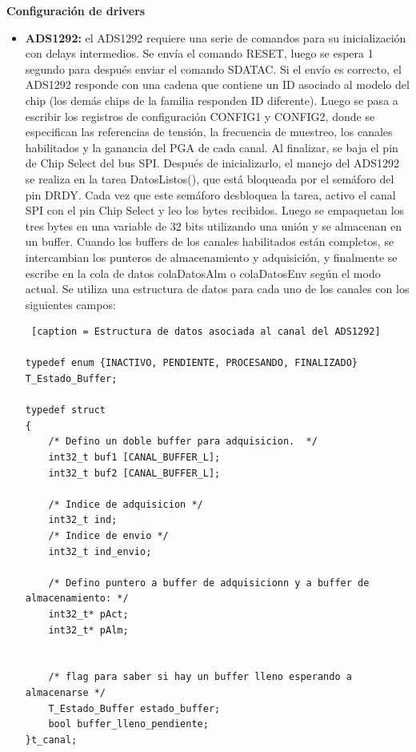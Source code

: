 \textbf{Configuración de drivers}

\begin{itemize}

 	\item \textbf{ADS1292:} el ADS1292 requiere una serie de comandos para su inicialización\cite{texas2012} con delays intermedios. Se envía el comando RESET, luego se espera 1 segundo para después enviar el comando SDATAC. Si el envío es correcto, el ADS1292 responde con una cadena que contiene un ID asociado al modelo del chip (los demás chips de la familia responden ID diferente). 
 	Luego se pasa a escribir los registros de configuración CONFIG1 y CONFIG2, donde se especifican las referencias de tensión, la frecuencia de muestreo, los canales habilitados y la ganancia del PGA de cada canal. Al finalizar, se baja el pin de Chip Select del bus SPI. 
 	Después de inicializarlo, el manejo del ADS1292 se realiza en la tarea DatosListos(), que está bloqueada por el semáforo del pin DRDY. Cada vez que este semáforo desbloquea la tarea, activo el canal SPI con el pin Chip Select y leo los bytes recibidos. Luego se empaquetan los tres bytes en una variable de 32 bits utilizando una unión y se almacenan en un buffer. Cuando los buffers de los canales habilitados están completos, se intercambian los punteros de almacenamiento y adquisición, y finalmente se escribe en la cola de datos colaDatosAlm o colaDatosEnv según el modo actual.
 	Se utiliza una estructura de datos para cada uno de los canales con los siguientes campos:
 	
\footnotesize 	
\begin{lstlisting} [caption = Estructura de datos asociada al canal del ADS1292]

typedef enum {INACTIVO, PENDIENTE, PROCESANDO, FINALIZADO} T_Estado_Buffer;

typedef struct
{
	/* Defino un doble buffer para adquisicion.  */
	int32_t buf1 [CANAL_BUFFER_L];
	int32_t buf2 [CANAL_BUFFER_L];

	/* Indice de adquisicion */
	int32_t ind;
	/* Indice de envio */
	int32_t ind_envio;

	/* Defino puntero a buffer de adquisicionn y a buffer de almacenamiento: */
	int32_t* pAct;
	int32_t* pAlm;


	/* flag para saber si hay un buffer lleno esperando a almacenarse */
	T_Estado_Buffer estado_buffer;
	bool buffer_lleno_pendiente;
}t_canal;


\end{lstlisting}	
\normalsize


\end{itemize}
